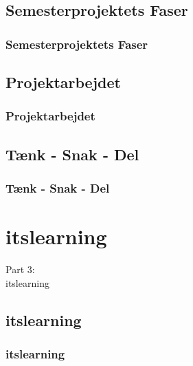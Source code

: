 \documentclass[t, aspectratio=169]{beamer}
\begin{document}
\subsection{Semesterprojektets Faser}
\begin{frame}[fragile]
  \frametitle{Semesterprojektets Faser}
  \vspace{1mm}
  
\end{frame}


\subsection{Projektarbejdet}
\begin{frame}[fragile]
  \frametitle{Projektarbejdet}
  \vspace{1mm}
  
\end{frame}

\subsection{Tænk - Snak - Del}
\begin{frame}[fragile]
  \frametitle{Tænk - Snak - Del}
  \vspace{1mm}
  
\end{frame}

\section{itslearning}
\begin{frame}
  \vspace{25mm}
  \begin{center}
    \Huge{Part 3:\\itslearning}
  \end{center}
\end{frame}

\subsection{itslearning}
\begin{frame}[fragile]
  \frametitle{itslearning}
  \vspace{1mm}
  
\end{frame}
\end{document}
